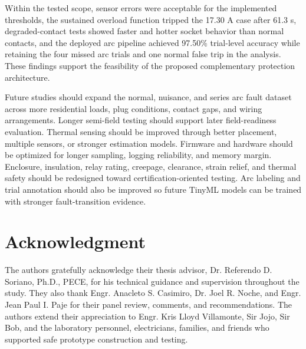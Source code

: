 \documentclass[conference,a4paper]{template/IEEEtran}
\begin{document}
Within the tested scope, sensor errors were acceptable for the implemented
thresholds, the sustained overload function tripped the 17.30 A case after
61.3 s, degraded-contact tests showed faster and hotter socket behavior
than normal contacts, and the deployed arc pipeline achieved 97.50\%
trial-level accuracy while retaining the four missed arc trials and one
normal false trip in the analysis. These findings support the feasibility
of the proposed complementary protection architecture.

Future studies should expand the normal, nuisance, and series arc fault
dataset across more residential loads, plug conditions, contact gaps, and
wiring arrangements. Longer semi-field testing should support later
field-readiness evaluation. Thermal sensing should be improved through better
placement, multiple sensors, or stronger estimation models. Firmware and
hardware should be optimized for longer sampling, logging reliability,
and memory margin. Enclosure, insulation, relay rating, creepage,
clearance, strain relief, and thermal safety should be redesigned toward
certification-oriented testing. Arc labeling and trial annotation should
also be improved so future TinyML models can be trained with stronger
fault-transition evidence.

\section*{Acknowledgment}

The authors gratefully acknowledge their thesis advisor, Dr. Referendo D. Soriano, Ph.D., PECE,
for his technical guidance and supervision throughout the study. They also
thank Engr. Anacleto S. Casimiro, Dr. Joel R. Noche, and Engr. Jean Paul
I. Paje for their panel review, comments, and recommendations. The authors
extend their appreciation to Engr. Kris Lloyd Villamonte, Sir Jojo, Sir Bob,
and the laboratory personnel, electricians, families, and friends who
supported safe prototype construction and testing.
\end{document}
